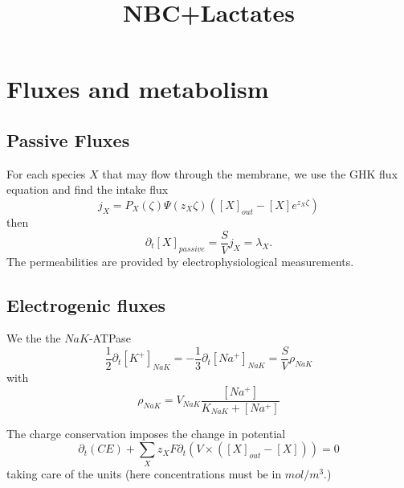 \documentclass{revtex4}
\begin{document}
\title{NBC+Lactates}
\maketitle

\section{Fluxes and metabolism}

\subsection{Passive Fluxes}
For each species $X$ that may flow through the membrane, we use the GHK flux equation and find the intake flux
\begin{equation}
	j_X =  P_X\left(\zeta\right) \Psi(z_X\zeta)
	\left([X]_{out} - [X]e^{z_X\zeta}\right)
\end{equation}
then
\begin{equation}
	\partial_t [X]_{passive} = \dfrac{S}{V} j_X = \lambda_X.
\end{equation}
The permeabilities are provided by electrophysiological measurements.

\subsection{Electrogenic fluxes}
We the the $NaK$-ATPase
\begin{equation}
	\dfrac{1}{2} \partial_t \left[K^+\right]_{{NaK}} = -\dfrac{1}{3} \partial_t \left[ Na^+\right]_{{NaK}}
	= \dfrac{S}{V}\rho_{NaK}
\end{equation}
with
\begin{equation}
	\rho_{NaK} = V_{NaK} \dfrac{\left[Na^+\right]}{K_{NaK}+\left[Na^+\right]}
\end{equation}

The charge conservation imposes the change in potential
\begin{equation}
	\partial_t\left( C E\right) + \sum_X z_X F \partial_t\left( V \times  (\left[X\right]_{out}-\left[X\right]) \right) = 0
\end{equation}
taking care of the units (here concentrations must be in $mol/m^3$.)
\end{document}
